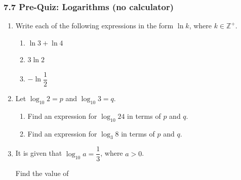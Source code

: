 \documentclass[12pt, twoside]{article}
\begin{document}
\subsubsection*{7.7 Pre-Quiz: Logarithms (no calculator)}

\begin{enumerate}[itemsep=0.15cm]

\item[1.] Write each of the following expressions in the form $\ln k$,
where $k \in \mathbb{Z}^{+}$.

\begin{enumerate}[itemsep=0.15cm]
  \item $\ln 3 + \ln 4$

  \item $3\ln 2$

  \item $-\ln\dfrac{1}{2}$
\end{enumerate}


\newpage

\item[2.] Let $\log_{10} 2 = p$ and $\log_{10} 3 = q$.

\begin{enumerate}[itemsep=0.15cm]
  \item Find an expression for $\log_{10} 24$ in terms of $p$ and $q$.

  \item Find an expression for $\log_{3} 8$ in terms of $p$ and $q$.
\end{enumerate}


\newpage

\item[3.] It is given that $\log_{10} a = \dfrac{1}{3}$, where $a > 0$.

Find the value of


\end{enumerate}
\end{document}
